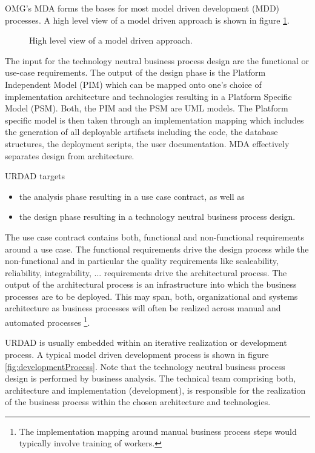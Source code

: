 \documentclass{IOS-Book-Article}
\begin{document}
OMG's MDA forms the bases for most model driven development (MDD) 
processes\cite{selic:pragmaticsOfModelDrivenDevelopment,schmidt:modelDrivenEngineering}.
A high level view of a model driven approach
is shown in figure \ref{fig:modelDrivenApproach}.

\begin{figure}[hbt]
  \centering
  \caption{High level view of a model driven approach.}
  \label{fig:modelDrivenApproach}
\end{figure}

The input for the technology neutral business process design are the functional or use-case requirements. 
The output of the design phase is the Platform Independent Model (PIM) which can be mapped
onto one's choice of implementation architecture and technologies resulting in a Platform Specific
Model (PSM). Both, the PIM and the PSM are UML models. The Platform specific model is then taken
through an implementation mapping which includes the generation of all deployable artifacts including
the code, the database structures, the deployment scripts, the user documentation. MDA effectively
separates design from architecture.

URDAD targets
\begin{itemize}
  \item the analysis phase resulting in a use case contract, as well as  
  \item the design phase resulting in a technology neutral business process design.
\end{itemize}  
The use case contract contains both, functional and non-functional requirements around a use case. The
functional requirements drive the design process while the non-functional 
and in particular the quality requirements like scaleability, reliability, integrability, ... requirements 
drive the architectural process. The output of the architectural process is an 
infrastructure into which the business processes are to be deployed. 
This may span, both, organizational and systems architecture as business processes will often be realized 
across manual and automated processes
\footnote{The implementation mapping around manual business process steps would typically involve training of workers.}.

URDAD is usually embedded within an iterative realization or development process. 
A typical model driven development process is shown in figure \ref{fig:developmentProcess}. 
Note that the technology neutral business process design is performed by business analysis. 
The technical team comprising both, architecture and implementation (development), 
is responsible for the realization of the business process within the chosen architecture and technologies.
\end{document}
